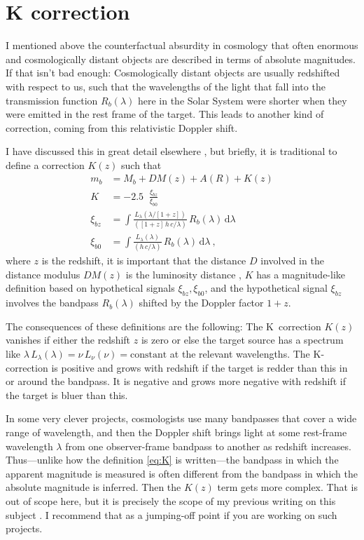 \documentclass[10pt]{article}
\newcommand{\dd}{\mathrm{d}}
\DeclareMathOperator{\logten}{log_{10}}
\begin{document}
\section{K correction}\label{sec:kcorrect}

I mentioned above the counterfactual absurdity in cosmology that often enormous and cosmologically distant objects are described in terms of absolute magnitudes.
If that isn't bad enough:
Cosmologically distant objects are usually redshifted with respect to us, such that the wavelengths of the light that fall into the transmission function $R_b(\lambda)$ here in the Solar System were shorter when they were emitted in the rest frame of the target.
This leads to another kind of correction, coming from this relativistic Doppler shift.

I have discussed this in great detail elsewhere \cite{kcorrect}, but briefly, it is traditional to define a correction $K(z)$ such that
\begin{align}
    m_b &= M_b + DM(z) + A(R) + K(z)\label{eq:K}\\
    K &= -2.5\logten\frac{\xi_{bz}}{\xi_{b0}}\\
    \xi_{bz} &= \int\frac{L_\lambda(\lambda/[1+z])}{([1+z]\,h\,c/\lambda)}\,R_b(\lambda)\,\dd\lambda\\
    \xi_{b0} &= \int\frac{L_\lambda(\lambda)}{(h\,c/\lambda)}\,R_b(\lambda)\,\dd\lambda ~,
\end{align}
where $z$ is the redshift,
it is important that the distance $D$ involved in the distance modulus $DM(z)$ is the luminosity distance \cite{distances},
$K$ has a magnitude-like definition based on hypothetical signals $\xi_{bz}, \xi_{b0}$,
and the hypothetical signal $\xi_{bz}$ involves the bandpass $R_b(\lambda)$ shifted by the Doppler factor $1+z$.

The consequences of these definitions are the following:
The K~correction $K(z)$ vanishes if either the redshift $z$ is zero or else the target source has a spectrum like $\lambda\,L_\lambda(\lambda)=\nu\,L_\nu(\nu)=\text{constant}$ at the relevant wavelengths.
The K-correction is positive and grows with redshift if the target is redder than this in or around the bandpass.
It is negative and grows more negative with redshift if the target is bluer than this.

In some very clever projects, cosmologists use many bandpasses that cover a wide range of wavelength, and then the Doppler shift brings light at some rest-frame wavelength $\lambda$ from one observer-frame bandpass to another as redshift increases.
Thus---unlike how the definition \eqref{eq:K} is written---the bandpass in which the apparent magnitude is measured is often different from the bandpass in which the absolute magnitude is inferred. Then the $K(z)$ term gets more complex.
That is out of scope here, but it is precisely the scope of my previous writing on this subject \cite{kcorrect}.
I recommend that as a jumping-off point if you are working on such projects.
\end{document}
